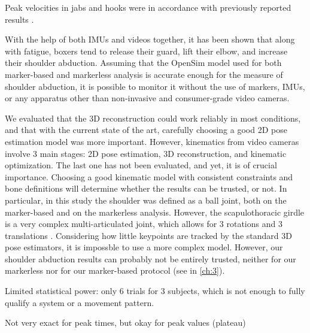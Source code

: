 Peak velocities in jabs and hooks were in accordance with previously reported results \cite{Whiting1988,Piorkowski2011}.

With the help of both IMUs and videos together, it has been shown that along with fatigue, boxers tend to release their guard, lift their elbow, and increase their shoulder abduction. Assuming that the OpenSim model used for both marker-based and markerless analysis is accurate enough for the measure of shoulder abduction, it is possible to monitor it without the use of markers, IMUs, or any apparatus other than non-invasive and consumer-grade video cameras.  

We evaluated that the 3D reconstruction could work reliably in most conditions, and that with the current state of the art, carefully choosing a good 2D pose estimation model was more important. However, kinematics from video cameras involve 3 main stages: 2D pose estimation, 3D reconstruction, and kinematic optimization. The last one has not been evaluated, and yet, it is of crucial importance. Choosing a good kinematic model with consistent constraints and bone definitions will determine whether the results can be trusted, or not. In particular, in this study the shoulder was defined as a ball joint, both on the marker-based and on the markerless analysis. However, the scapulothoracic girdle is a very complex multi-articulated joint, which allows for 3 rotations and 3 translations \cite{Seth2016}. Considering how little keypoints are tracked by the standard 3D pose estimators, it is impossble to use a more complex model. However, our shoulder abduction results can probably not be entirely trusted, neither for our markerless nor for our marker-based protocol (see  in \autoref{ch:3}).


Limited statistical power: only 6 trials for 3 subjects, which is not enough to fully qualify a system or a movement pattern.

Not very exact for peak times, but okay for peak values (plateau)







